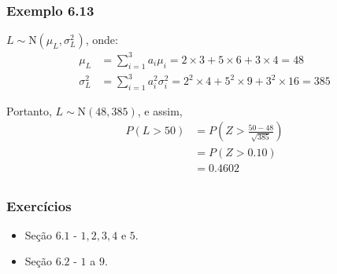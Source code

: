 \documentclass[11pt]{beamer}
\begin{document}
\begin{frame}
\frametitle{Exemplo 6.13}

\(L \sim \text{N}(\mu_L, \sigma^2_L)\), onde: \begin{align*}
\mu_L &= \sum_{i=1}^3 a_i \mu_i = 2 \times 3 + 5 \times 6 +
  3 \times 4 = 48 \\
\sigma^2_L &= \sum_{i=1}^3 a_i^2 \sigma^2_i = 2^2 \times 4 +
  5^2 \times 9 + 3^2 \times 16 = 385
\end{align*}

Portanto, \(L \sim \text{N}(48, 385)\), e assim, \begin{align*}
P(L > 50) &= P\left( Z > \frac{50-48}{\sqrt{385}}\right) \\
  &= P(Z > 0.10) \\
  &= 0.4602 \\
\end{align*}
\end{frame}

\begin{frame}
\frametitle{Exercícios}

\begin{itemize}
\item
  Seção \(6.1\) - \(1,2,3,4\) e \(5\).
\item
  Seção \(6.2\) - \(1\) a \(9\).
\end{itemize}
\end{frame}
\end{document}

